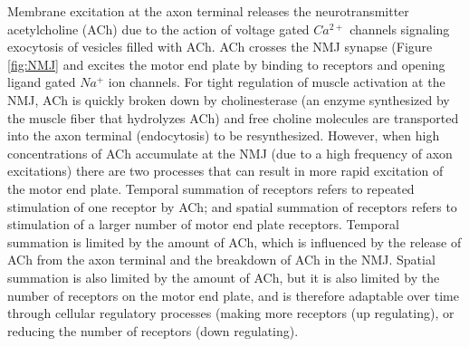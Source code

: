 Membrane excitation at the axon terminal releases the neurotransmitter acetylcholine (ACh) due to the action of voltage gated $Ca^{2+}$ channels signaling exocytosis of vesicles filled with ACh. ACh crosses the NMJ synapse (Figure \ref{fig:NMJ} and excites the motor end plate by binding to receptors and opening ligand gated $Na^+$ ion channels. For tight regulation of muscle activation at the NMJ, ACh is quickly broken down by cholinesterase (an enzyme synthesized by the muscle fiber that hydrolyzes ACh) and free choline molecules are transported into the axon terminal (endocytosis) to be resynthesized. However, when high concentrations of ACh accumulate at the NMJ (due to a high frequency of axon excitations) there are two processes that can result in more rapid excitation of the motor end plate.\footnotemark{} Temporal summation of receptors refers to repeated stimulation of one receptor by ACh; and spatial summation of receptors refers to stimulation of a larger number of motor end plate receptors. Temporal summation is limited by the amount of ACh, which is influenced by the release of ACh from the axon terminal and the breakdown of ACh in the NMJ. Spatial summation is also limited by the amount of ACh, but it is also limited by the number of receptors on the motor end plate, and is therefore adaptable over time through cellular regulatory processes (making more receptors (up regulating), or reducing the number of receptors (down regulating).


